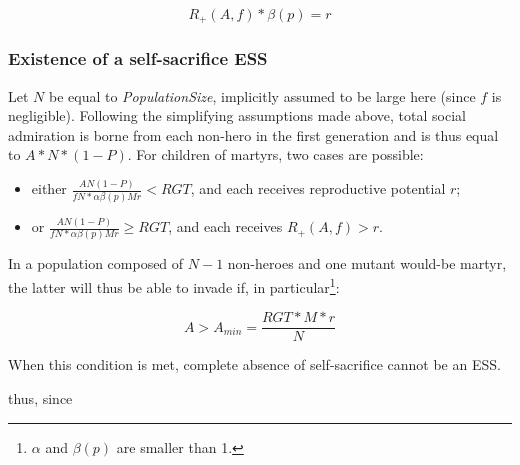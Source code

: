 \documentclass[a4paper,12pt]{article}
\begin{document}
\begin{equation}
    R_+(A,f)*\beta(p) = r
\label{eq:grandchildren}
\end{equation}


\subsubsection{Existence of a self-sacrifice ESS}
\label{ss: exo_existence}

Let $N$ be equal to \emph{PopulationSize}, implicitly assumed to be large here (since $f$
is negligible). Following the simplifying assumptions made above, total social admiration is
borne from each non-hero in the first generation and is thus equal to $A*N*(1-P)$. For children
of martyrs, two cases are possible:

\begin{itemize}
\item either $\frac{AN(1-P)}{fN*\alpha\beta(p)Mr} < RGT$, and each receives reproductive potential $r$;
\item or $\frac{AN(1-P)}{fN*\alpha\beta(p)Mr} \geq RGT$, and each receives $R_{+}(A,f)>r$.
\end{itemize}


In a population composed of $N-1$ non-heroes and one mutant would-be martyr, the latter will
thus be able to invade if, in particular\footnote{ $\alpha$ and $\beta(p)$ are smaller than 1.}:

\begin{equation}
    A > A_{min} = \frac{RGT*M*r}{N} 
\label{eq:ESS}
\end{equation}


When this condition is met, complete absence of self-sacrifice cannot be an ESS.  

thus, since 







\end{document}
